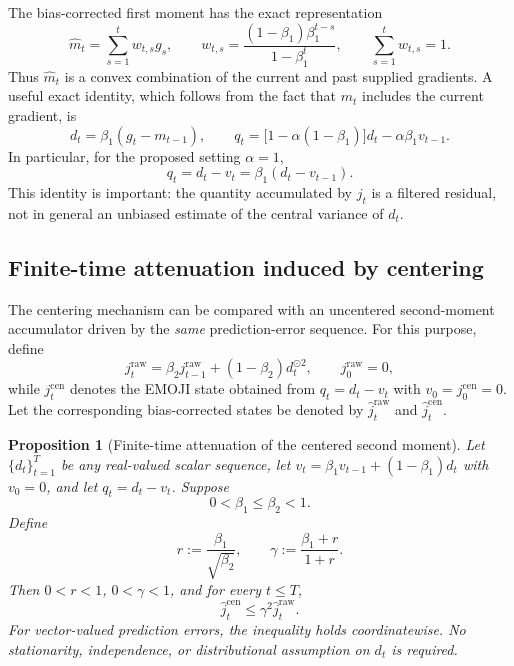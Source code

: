 \documentclass[11pt]{article}
\newtheorem{proposition}[theorem]{Proposition}
\begin{document}
The bias-corrected first moment has the exact representation
\begin{equation}
 \widehat m_t=\sum_{s=1}^t w_{t,s}g_s,
 \qquad
 w_{t,s}=\frac{(1-\beta_1)\beta_1^{t-s}}{1-\beta_1^t},
 \qquad \sum_{s=1}^t w_{t,s}=1.
 \label{eq:weights}
\end{equation}
Thus $\widehat m_t$ is a convex combination of the current and past supplied gradients. A useful exact identity, which follows from the fact that $m_t$ includes the current gradient, is
\begin{equation}
 d_t=\beta_1(g_t-m_{t-1}),\qquad
 q_t=\bigl[1-\alpha(1-\beta_1)\bigr]d_t-\alpha\beta_1v_{t-1}.
 \label{eq:residual-identity}
\end{equation}
In particular, for the proposed setting $\alpha=1$,
\begin{equation}
 q_t=d_t-v_t=\beta_1(d_t-v_{t-1}).
 \label{eq:centered-identity}
\end{equation}
This identity is important: the quantity accumulated by $j_t$ is a filtered residual, not in general an unbiased estimate of the central variance of $d_t$.

\subsection{Finite-time attenuation induced by centering}
The centering mechanism can be compared with an uncentered second-moment accumulator driven by the \emph{same} prediction-error sequence. For this purpose, define
\[
 j_t^{\mathrm{raw}}=\beta_2j_{t-1}^{\mathrm{raw}}+(1-\beta_2)d_t^{\odot2},
 \qquad j_0^{\mathrm{raw}}=0,
\]
while $j_t^{\mathrm{cen}}$ denotes the EMOJI state obtained from $q_t=d_t-v_t$ with $v_0=j_0^{\mathrm{cen}}=0$. Let the corresponding bias-corrected states be denoted by $\widehat j_t^{\mathrm{raw}}$ and $\widehat j_t^{\mathrm{cen}}$.

\begin{proposition}[Finite-time attenuation of the centered second moment]\label{prop:attenuation}
Let $\{d_t\}_{t=1}^T$ be any real-valued scalar sequence, let $v_t=\beta_1v_{t-1}+(1-\beta_1)d_t$ with $v_0=0$, and let $q_t=d_t-v_t$. Suppose
\[
 0<\beta_1\leq\beta_2<1.
\]
Define
\[
 r:=\frac{\beta_1}{\sqrt{\beta_2}},
 \qquad
 \gamma:=\frac{\beta_1+r}{1+r}.
\]
Then $0<r<1$, $0<\gamma<1$, and for every $t\leq T$,
\begin{equation}
 \widehat j_t^{\mathrm{cen}}
 \leq \gamma^2\widehat j_t^{\mathrm{raw}}.
 \label{eq:attenuation}
\end{equation}
For vector-valued prediction errors, the inequality holds coordinatewise. No stationarity, independence, or distributional assumption on $d_t$ is required.
\end{proposition}
\end{document}
